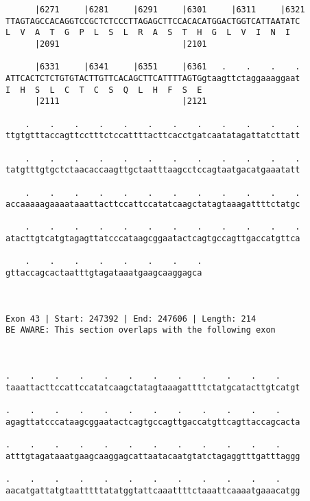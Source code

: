 \documentclass{article}
\begin{document}
\begin{Verbatim}
      |6271     |6281     |6291     |6301     |6311     |6321
TTAGTAGCCACAGGTCCGCTCTCCCTTAGAGCTTCCACACATGGACTGGTCATTAATATC
L  V  A  T  G  P  L  S  L  R  A  S  T  H  G  L  V  I  N  I  
      |2091                         |2101                   
  
      |6331     |6341     |6351     |6361   .    .    .    .
ATTCACTCTCTGTGTACTTGTTCACAGCTTCATTTTAGTGgtaagttctaggaaaggaat
I  H  S  L  C  T  C  S  Q  L  H  F  S  E                    
      |2111                         |2121                   
  
    .    .    .    .    .    .    .    .    .    .    .    .
ttgtgtttaccagttcctttctccattttacttcacctgatcaatatagattatcttatt
                                                            
    .    .    .    .    .    .    .    .    .    .    .    .
tatgtttgtgctctaacaccaagttgctaatttaagcctccagtaatgacatgaaatatt
                                                            
    .    .    .    .    .    .    .    .    .    .    .    .
accaaaaagaaaataaattacttccattccatatcaagctatagtaaagattttctatgc
                                                            
    .    .    .    .    .    .    .    .    .    .    .    .
atacttgtcatgtagagttatcccataagcggaatactcagtgccagttgaccatgttca
                                                            
    .    .    .    .    .    .    .    .
gttaccagcactaatttgtagataaatgaagcaaggagca
                                        
                                        
 
Exon 43 | Start: 247392 | End: 247606 | Length: 214
BE AWARE: This section overlaps with the following exon



.    .    .    .    .    .    .    .    .    .    .    .    
taaattacttccattccatatcaagctatagtaaagattttctatgcatacttgtcatgt
                                                            
.    .    .    .    .    .    .    .    .    .    .    .    
agagttatcccataagcggaatactcagtgccagttgaccatgttcagttaccagcacta
                                                            
.    .    .    .    .    .    .    .    .    .    .    .    
atttgtagataaatgaagcaaggagcattaatacaatgtatctagaggtttgatttaggg
                                                            
.    .    .    .    .    .    .    .    .    .    .    .    
aacatgattatgtaatttttatatggtattcaaattttctaaattcaaaatgaaacatgg
                                                            

\end{Verbatim}
\end{document}
